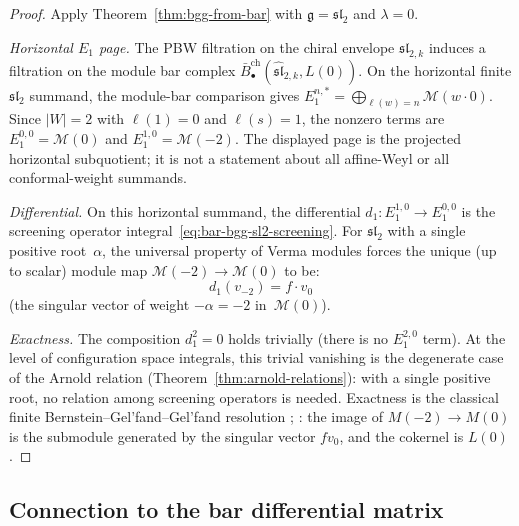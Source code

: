 \begin{proof}
Apply Theorem~\ref{thm:bgg-from-bar} with
$\mathfrak{g} = \mathfrak{sl}_2$ and $\lambda = 0$.

\emph{Horizontal $E_1$ page.}
The PBW filtration on the chiral envelope
$\widehat{\mathfrak{sl}}_{2,k}$ induces a filtration on
the module bar complex
$\bar{B}_\bullet^{\mathrm{ch}}(\widehat{\mathfrak{sl}}_{2,k},
L(0))$. On the horizontal finite $\mathfrak{sl}_2$ summand, the
module-bar comparison gives
$E_1^{n,*} = \bigoplus_{\ell(w) = n} \mathcal{M}(w \cdot 0)$.
Since $|W| = 2$ with $\ell(1) = 0$ and $\ell(s) = 1$,
the nonzero terms are $E_1^{0,0} = \mathcal{M}(0)$ and
$E_1^{1,0} = \mathcal{M}(-2)$. The displayed page is the
projected horizontal subquotient; it is not a statement about all
affine-Weyl or all conformal-weight summands.

\emph{Differential.}
On this horizontal summand, the
differential $d_1\colon E_1^{1,0} \to E_1^{0,0}$
is the screening operator integral~\eqref{eq:bar-bgg-sl2-screening}.
For $\mathfrak{sl}_2$ with a single positive root~$\alpha$,
the universal property of Verma modules forces the unique
(up to scalar) module map
$\mathcal{M}(-2) \to \mathcal{M}(0)$ to be:
\[
d_1(v_{-2}) = f \cdot v_0
\]
(the singular vector of weight $-\alpha = -2$
in~$\mathcal{M}(0)$).

\emph{Exactness.}
The composition $d_1^2 = 0$ holds trivially
(there is no $E_1^{2,0}$ term). At the level of
configuration space integrals, this trivial vanishing
is the degenerate case of the Arnold relation
(Theorem~\ref{thm:arnold-relations}): with a single
positive root, no relation among screening operators
is needed. Exactness is the classical finite
Bernstein--Gel'fand--Gel'fand resolution
\cite{BGG76}; \cite[\S10.7]{Kac}: the image of
$M(-2)\to M(0)$ is the submodule generated by the singular vector
$f v_0$, and the cokernel is $L(0)$.
\end{proof}


\subsection{Connection to the bar differential matrix}

